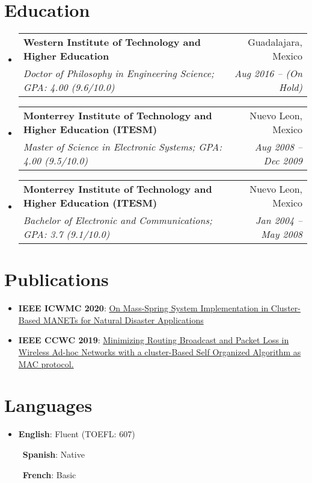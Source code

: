 \documentclass[letterpaper,11pt]{article}
\makeatletter
\newcommand{\resumeItem}[2]{
    \item\small{
        \textbf{#1}{: #2 \vspace{-2pt}}
    }
}
\newcommand{\resumeItemHorizontal}[2]{
    \textbullet\ \textbf{#1}: #2 \hspace{10pt}
}
\newcommand{\resumeSubheading}[4]{
    \vspace{-1pt}\item
    \begin{tabular*}{0.97\textwidth}{l@{\extracolsep{\fill}}r}
        \textbf{#1} & #2 \\
        \textit{\small#3} & \textit{\small #4} \\
    \end{tabular*}\vspace{-5pt}
}
\newcommand{\resumeSubHeadingListStart}{\begin{itemize}[leftmargin=*]}
\newcommand{\resumeSubHeadingListEnd}{\end{itemize}}
\newcommand{\resumeItemListStart}{\begin{itemize}}
\newcommand{\resumeItemListEnd}{\end{itemize}\vspace{-5pt}}
\makeatother
\begin{document}
\section{Education}
\resumeSubHeadingListStart
\resumeSubheading
{Western Institute of Technology and Higher Education}{Guadalajara, Mexico}
{Doctor of Philosophy in Engineering Science; GPA: 4.00 (9.6/10.0)}{Aug 2016 -- (On Hold)}
\resumeSubheading
{Monterrey Institute of Technology and Higher Education (ITESM)}{Nuevo Leon, Mexico}
{Master of Science in Electronic Systems;  GPA: 4.00 (9.5/10.0)}{Aug 2008 -- Dec 2009}
\resumeSubheading
{Monterrey Institute of Technology and Higher Education (ITESM)}{Nuevo Leon, Mexico}
{Bachelor of Electronic and Communications;  GPA: 3.7 (9.1/10.0)}{Jan 2004 -- May 2008}
\resumeSubHeadingListEnd

%
\section{Publications}
\label{sec:Publications}
\resumeSubHeadingListStart
\resumeItem{IEEE ICWMC 2020}{\href{http://www.thinkmind.org/index.php?view=article&articleid=icwmc_2020_1_10_20034}{On Mass-Spring System Implementation in Cluster-Based MANETs for Natural Disaster Applications}}
\resumeItem{IEEE CCWC 2019}{\href{https://ieeexplore.ieee.org/document/8666583}{Minimizing Routing Broadcast and Packet Loss in Wireless Ad-hoc Networks with a cluster-Based Self Organized Algorithm as MAC protocol.}}
\resumeSubHeadingListEnd

\section{Languages}
\resumeSubHeadingListStart
\resumeItem{English}{Fluent (TOEFL: 607)}
\resumeItemHorizontal{Spanish}{Native}
\resumeItemHorizontal{French}{Basic}
\resumeSubHeadingListEnd
\end{document}
